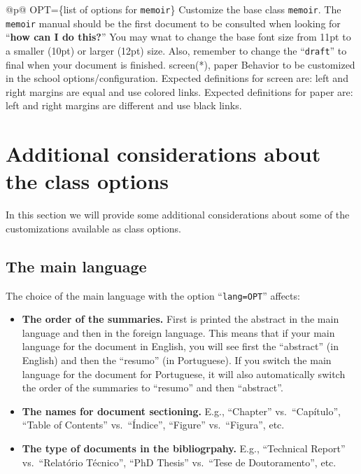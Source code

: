 \begin{ctabular}{@{}p{\linewidth}@{}}
    {OPT=\{list of options for \texttt{memoir}\}}%
    {Customize the base class \texttt{memoir}. The \texttt{memoir} manual should be the first document to be consulted when looking for “\textbf{how can I do this?}” You may wnat to change the base font size from 11pt to a smaller (10pt) or larger (12pt) size.  Also, remember to change the “\texttt{draft}” to final when your document is finished.}
    \midrule
    {screen(*), paper}%
    {Behavior to be customized in the school options/configuration. Expected definitions for screen are: left and right margins are equal and use colored links. Expected definitions for paper are: left and right margins are different and use black links.}
    \bottomrule
\end{ctabular}

\section{Additional considerations about the class options} %
\label{sec:additional_considerations}

In this section we will provide some additional considerations about some of the customizations available as class options.

\subsection{The main language} %
\label{sub:the_main_language}

The choice of the main language with the option “\texttt{lang=OPT}” affects:

\begin{itemize}
	\item \textbf{The order of the summaries.} First is printed the abstract in the main language and then in the foreign language. This means that if your main language for the document in English, you will see first the “abstract” (in English) and then the “resumo” (in Portuguese). If you switch the main language for the document for Portuguese, it will also automatically switch the order of the summaries to “resumo” and then “abstract”.
	\item \textbf{The names for document sectioning.} E.g., ``Chapter'' vs.\ ``Capítulo'', ``Table of Contents'' vs.\ ``Índice'', ``Figure'' vs.\ ``Figura'', etc.
	\item \textbf{The type of documents in the bibliogrpahy.} E.g., ``Technical Report'' vs.\ ``Relatório Técnico'', ``PhD Thesis'' vs.\ ``Tese de Doutoramento'', etc.
\end{itemize} 

